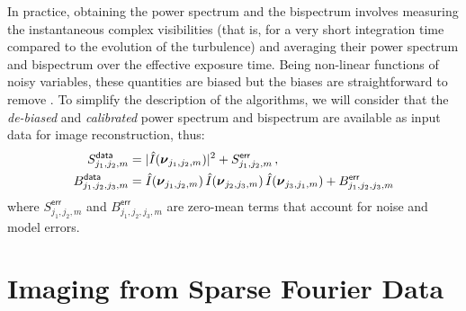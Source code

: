 \documentclass{article}
\makeatletter
\newcommand{\MathFunc}[1]{\mathop{\operator@font #1}\nolimits}
\newcommand{\Tag}[1]{\mathsf{#1}}        %
\newcommand{\V}[1]{\boldsymbol{#1}}      %
\newcommand{\FT}[1]{\hat{#1}}            %
\newcommand{\arc}{\MathFunc{arc}}        %
\newcommand{\abs}[1]{\vert #1\vert}
\newcommand{\VisPhase}{\varphi}
\newcommand{\Powerspectrum}{S}
\newcommand{\Bispectrum}{B}
\newcommand{\PhaseClosure}{\beta}
\newcommand{\Freq}{\nu}               %
\newcommand{\VFreq}{\V{\Freq}}
\newcommand{\Image}{I}
\newcommand{\DataTag}{\Tag{data}}
\newcommand{\ErrorTag}{\Tag{err}}
\makeatother
\begin{document}
In practice, obtaining the power spectrum and the bispectrum involves
measuring the instantaneous complex visibilities (that is, for a very short
integration time compared to the evolution of the turbulence) and averaging
their power spectrum and bispectrum over the effective exposure time.  Being
non-linear functions of noisy variables, these quantities are biased but the
biases are straightforward to remove \citep{Gordon_Buscher-2012-bias}.  To
simplify the description of the algorithms, we will consider that the
\emph{de-biased} and \emph{calibrated} power spectrum and bispectrum are
available as input data for image reconstruction, thus:
\begin{align}
  \Powerspectrum_{j_1,j_2,m}^\DataTag
  &= \abs{\FT{\Image}(\VFreq_{j_1,j_2,m})}^2
     + \Powerspectrum_{j_1,j_2,m}^\ErrorTag \, ,
  \label{eq:powerspectrum-data}
  \\
  \Bispectrum_{j_1,j_2,j_3,m}^\DataTag
  &= \FT{\Image}(\VFreq_{j_1,j_2,m}) \,
     \FT{\Image}(\VFreq_{j_2,j_3,m}) \,
     \FT{\Image}(\VFreq_{j_3,j_1,m}) \notag
     + \Bispectrum_{j_1,j_2,j_3,m}^\ErrorTag
  \label{eq:bispectrum-data}
\end{align}
where $\Powerspectrum_{j_1,j_2,m}^\ErrorTag$ and
$\Bispectrum_{j_1,j_2,j_3,m}^\ErrorTag$ are zero-mean terms that account for
noise and model errors.


\section{Imaging from Sparse Fourier Data}
\label{sec:image-reconstruction}
\end{document}
